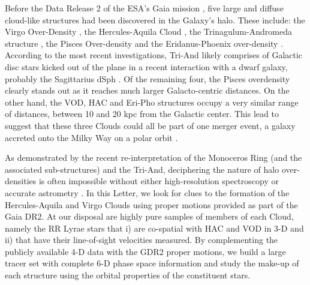 \documentclass[fleqn,usenatbib]{mnras}
\begin{document}
Before the Data Release 2 \citep[][]{Brown2018} of the ESA's Gaia
mission \citep[][]{Prusti2016}, five large and diffuse cloud-like
structures had been discovered in the Galaxy's halo. These include:
the Virgo Over-Density
\citep[VOD,][]{Vivas2001,Newberg2002,Duffau2006,Juric2008,Bonaca2012},
the Hercules-Aquila Cloud \citep[HAC,][]{Be07,Simion2014}, the
Trinagulum-Andromeda structure
\citep[Tri-And,][]{Rocha2004,Majewski2004,Deason2014}, the Pisces
Over-density \citep[][]{Sesar2007,Wa09,Nie2015} and the
Eridanus-Phoenix over-density \citep[Eri-Pho,][]{Li2016}. According to
the most recent investigations, Tri-And likely comprises of Galactic
disc stars kicked out of the plane in a recent interaction with a
dwarf galaxy, probably the Sagittarius dSph
\citep[e.g.][]{Pr15,Bergemann2018,Hayes2018}. Of the remaining four,
the Pisces overdensity clearly stands out as it reaches much larger
Galacto-centric distances. On the other hand, the VOD, HAC and Eri-Pho
structures occupy a very similar range of distances, between 10 and 20
kpc from the Galactic center. This lead \citet{Li2016} to suggest that
these three Clouds could all be part of one merger event, a galaxy
accreted onto the Milky Way on a polar orbit \citep[see
  also][]{Juric2008}.

As demonstrated by the recent re-interpretation of the Monoceros Ring
(and the associated sub-structures) and the Tri-And, deciphering the
nature of halo over-densities is often impossible without either
high-resolution spectroscopy \citep[e.g.][]{Bergemann2018} or accurate
astrometry \citep[e.g.][]{deBoer2018,Deason2018}. In this Letter, we
look for clues to the formation of the Hercules-Aquila and Virgo
Clouds using proper motions provided as part of the Gaia DR2. At our
disposal are highly pure samples of members of each Cloud, namely the
RR Lyrae stars that i) are co-spatial with HAC and VOD in 3-D and ii)
that have their line-of-sight velocities measured. By complementing
the publicly available 4-D data with the GDR2 proper motions, we build
a large tracer set with complete 6-D phase space information and study
the make-up of each structure using the orbital properties of the
constituent stars.
\end{document}
